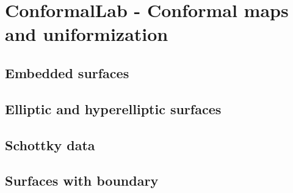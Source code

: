 \documentclass[Thesis.tex]{subfiles}
\begin{document}
\chapter{{\sc ConformalLab} - Conformal maps and uniformization}
\label{sec:conformallab}
\section{Embedded surfaces}
\section{Elliptic and hyperelliptic surfaces}
\section{Schottky data}
\section{Surfaces with boundary}

\subfilebibliography
\end{document}

